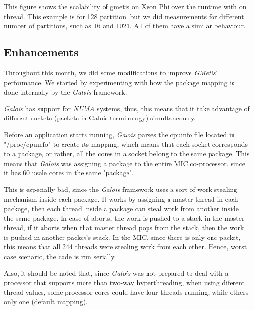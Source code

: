 \documentclass[abstract=on,9pt,twocolumn]{scrartcl}
\begin{document}
This figure shows the scalability of gmetis on Xeon Phi over the runtime
with on thread. This example is for 128 partition, but we did
measurements for different number of partitions, such as 16 and 1024. All
of them have a similar behaviour.


\subsection{Enhancements}

Throughout this month, we did some modifications to improve
\textit{GMetis}' performance. We started by experimenting with how the package mapping
is done internally by the \textit{Galois} framework.

\textit{Galois} has support for \textit{NUMA} systems, thus, this means that
it take advantage of different sockets (packets in Galois terminology) simultaneously.

Before an application starts running, \textit{Galois} parses the
cpuinfo file located in "/proc/cpuinfo" to create its mapping, which means that each socket
corresponds to a package, or rather, all the cores in a socket belong to the same package.
This means that \textit{Galois} was assigning a package to the entire MIC co-processor, since it has 60 usale cores in the same "package".

This is especially bad, since the \textit{Galois} framework uses a sort of work stealing mechanism inside each package. It works by assigning a master thread in each package, then each thread inside a package can steal work from another inside the same package. In case of aborts, the work is pushed to a stack in the master thread, if it aborts when that master thread pops from the stack, then the work is pushed in another packet's stack. In the MIC, since there is only one packet, this means that all 244 threads were stealing work from each other. Hence, worst case scenario, the code is run serially. 

Also, it should be noted that, since \textit{Galois} was not prepared to deal with a processor that supports more than two-way hyperthreading, when using diferent thread values, some processor cores could have four threads running, while others only one (default mapping).
\end{document}
